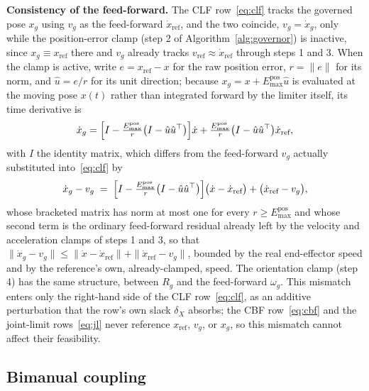 \textbf{Consistency of the feed-forward.} The CLF row~\eqref{eq:clf} tracks the governed pose $x_g$ using $v_g$ as the feed-forward $\dot{x}_{\text{ref}}$, and the two coincide, $v_g = \dot{x}_g$, only while the position-error clamp (step 2 of Algorithm~\ref{alg:governor}) is inactive, since $x_g \equiv x_{\text{ref}}$ there and $v_g$ already tracks $v_{\text{ref}} \approx \dot{x}_{\text{ref}}$ through steps 1 and 3. When the clamp is active, write $e = x_{\text{ref}} - x$ for the raw position error, $r = \|e\|$ for its norm, and $\hat{u} = e/r$ for its unit direction; because $x_g = x + E_{\max}^{\text{pos}}\hat{u}$ is evaluated at the moving pose $x(t)$ rather than integrated forward by the limiter itself, its time derivative is
\begin{equation}
\dot{x}_g = \Bigl[I - \tfrac{E_{\max}^{\text{pos}}}{r}\bigl(I - \hat{u}\hat{u}^{\top}\bigr)\Bigr]\dot{x} + \tfrac{E_{\max}^{\text{pos}}}{r}\bigl(I - \hat{u}\hat{u}^{\top}\bigr)\dot{x}_{\text{ref}},
\label{eq:govmismatch}
\end{equation}
with $I$ the identity matrix, which differs from the feed-forward $v_g$ actually substituted into~\eqref{eq:clf} by
\begin{equation}
\dot{x}_g - v_g \;=\; \Bigl[I - \tfrac{E_{\max}^{\text{pos}}}{r}\bigl(I - \hat{u}\hat{u}^{\top}\bigr)\Bigr]\bigl(\dot{x} - \dot{x}_{\text{ref}}\bigr) + \bigl(\dot{x}_{\text{ref}} - v_g\bigr),
\label{eq:govmismatchbound}
\end{equation}
whose bracketed matrix has norm at most one for every $r \ge E_{\max}^{\text{pos}}$ and whose second term is the ordinary feed-forward residual already left by the velocity and acceleration clamps of steps 1 and 3, so that $\|\dot{x}_g - v_g\| \le \|\dot{x} - \dot{x}_{\text{ref}}\| + \|\dot{x}_{\text{ref}} - v_g\|$, bounded by the real end-effector speed and by the reference's own, already-clamped, speed. The orientation clamp (step 4) has the same structure, between $R_g$ and the feed-forward $\omega_g$. This mismatch enters only the right-hand side of the CLF row~\eqref{eq:clf}, as an additive perturbation that the row's own slack $\delta_X$ absorbs; the CBF row~\eqref{eq:cbf} and the joint-limit rows~\eqref{eq:jl} never reference $x_{\text{ref}}$, $v_g$, or $x_g$, so this mismatch cannot affect their feasibility.

\subsection{Bimanual coupling}
\label{sec:bimanual}

